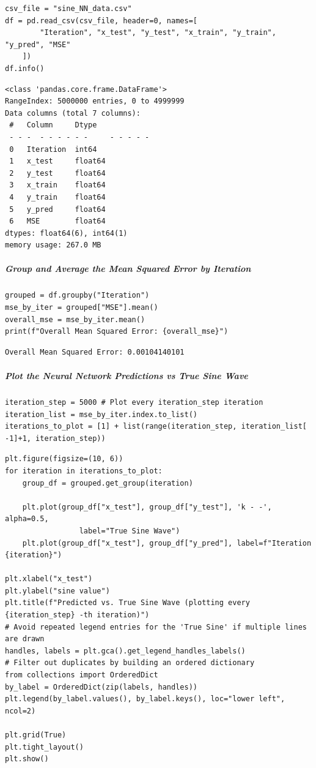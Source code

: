 \begin{verbatim}
csv_file = "sine_NN_data.csv"
df = pd.read_csv(csv_file, header=0, names=[
        "Iteration", "x_test", "y_test", "x_train", "y_train", "y_pred", "MSE"
    ])
df.info()
\end{verbatim}

\begin{verbatim}
<class 'pandas.core.frame.DataFrame'>
RangeIndex: 5000000 entries, 0 to 4999999
Data columns (total 7 columns):
 #   Column     Dtype  
 - - -  - - - - - -     - - - - -  
 0   Iteration  int64  
 1   x_test     float64
 2   y_test     float64
 3   x_train    float64
 4   y_train    float64
 5   y_pred     float64
 6   MSE        float64
dtypes: float64(6), int64(1)
memory usage: 267.0 MB
\end{verbatim}

\subparagraph{Group and Average the Mean Squared Error by Iteration}

\begin{verbatim}
grouped = df.groupby("Iteration")
mse_by_iter = grouped["MSE"].mean()
overall_mse = mse_by_iter.mean()
print(f"Overall Mean Squared Error: {overall_mse}")
\end{verbatim}

\begin{verbatim}
Overall Mean Squared Error: 0.00104140101
\end{verbatim}

\subparagraph{Plot the Neural Network Predictions vs True Sine Wave}

\begin{verbatim}
iteration_step = 5000 # Plot every iteration_step iteration
iteration_list = mse_by_iter.index.to_list()
iterations_to_plot = [1] + list(range(iteration_step, iteration_list[ -1]+1, iteration_step))
\end{verbatim}

\begin{verbatim}
plt.figure(figsize=(10, 6))
for iteration in iterations_to_plot:
    group_df = grouped.get_group(iteration)

    plt.plot(group_df["x_test"], group_df["y_test"], 'k - -', alpha=0.5,
                 label="True Sine Wave")
    plt.plot(group_df["x_test"], group_df["y_pred"], label=f"Iteration {iteration}")

plt.xlabel("x_test")
plt.ylabel("sine value")
plt.title(f"Predicted vs. True Sine Wave (plotting every {iteration_step} -th iteration)")
# Avoid repeated legend entries for the 'True Sine' if multiple lines are drawn
handles, labels = plt.gca().get_legend_handles_labels()
# Filter out duplicates by building an ordered dictionary
from collections import OrderedDict
by_label = OrderedDict(zip(labels, handles))
plt.legend(by_label.values(), by_label.keys(), loc="lower left", ncol=2)

plt.grid(True)
plt.tight_layout()
plt.show()
\end{verbatim}

